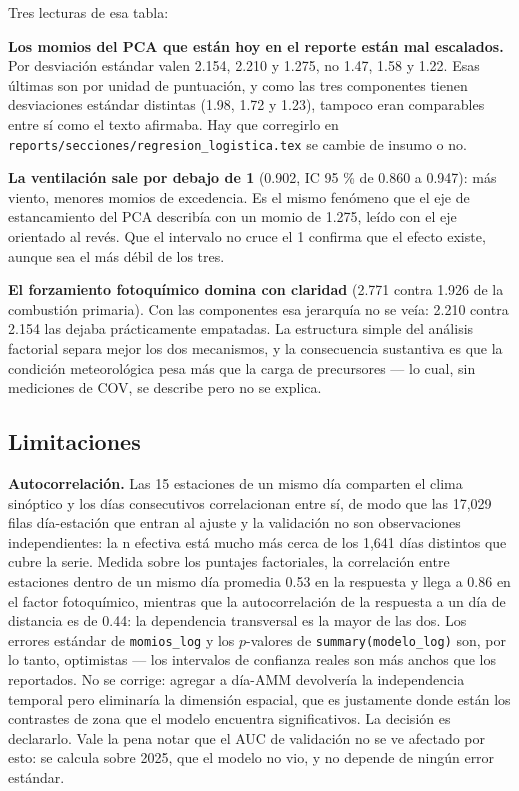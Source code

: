 \documentclass[
  spanish,
  letterpaper,
  DIV=11,
  numbers=noendperiod]{scrartcl}
\begin{document}
Tres lecturas de esa tabla:

\textbf{Los momios del PCA que están hoy en el reporte están mal
escalados.} Por desviación estándar valen 2.154, 2.210 y 1.275, no 1.47,
1.58 y 1.22. Esas últimas son por unidad de puntuación, y como las tres
componentes tienen desviaciones estándar distintas (1.98, 1.72 y 1.23),
tampoco eran comparables entre sí como el texto afirmaba. Hay que
corregirlo en \texttt{reports/secciones/regresion\_logistica.tex} se
cambie de insumo o no.

\textbf{La ventilación sale por debajo de 1} (0.902, IC 95 \% de 0.860 a
0.947): más viento, menores momios de excedencia. Es el mismo fenómeno
que el eje de estancamiento del PCA describía con un momio de 1.275,
leído con el eje orientado al revés. Que el intervalo no cruce el 1
confirma que el efecto existe, aunque sea el más débil de los tres.

\textbf{El forzamiento fotoquímico domina con claridad} (2.771 contra
1.926 de la combustión primaria). Con las componentes esa jerarquía no
se veía: 2.210 contra 2.154 las dejaba prácticamente empatadas. La
estructura simple del análisis factorial separa mejor los dos
mecanismos, y la consecuencia sustantiva es que la condición
meteorológica pesa más que la carga de precursores --- lo cual, sin
mediciones de COV, se describe pero no se explica.

\subsection{Limitaciones}\label{limitaciones}

\textbf{Autocorrelación.} Las 15 estaciones de un mismo día comparten el
clima sinóptico y los días consecutivos correlacionan entre sí, de modo
que las 17,029 filas día-estación que entran al ajuste y la validación
no son observaciones independientes: la n efectiva está mucho más cerca
de los 1,641 días distintos que cubre la serie. Medida sobre los
puntajes factoriales, la correlación entre estaciones dentro de un mismo
día promedia 0.53 en la respuesta y llega a 0.86 en el factor
fotoquímico, mientras que la autocorrelación de la respuesta a un día de
distancia es de 0.44: la dependencia transversal es la mayor de las dos.
Los errores estándar de \texttt{momios\_log} y los \(p\)-valores de
\texttt{summary(modelo\_log)} son, por lo tanto, optimistas --- los
intervalos de confianza reales son más anchos que los reportados. No se
corrige: agregar a día-AMM devolvería la independencia temporal pero
eliminaría la dimensión espacial, que es justamente donde están los
contrastes de zona que el modelo encuentra significativos. La decisión
es declararlo. Vale la pena notar que el AUC de validación no se ve
afectado por esto: se calcula sobre 2025, que el modelo no vio, y no
depende de ningún error estándar.
\end{document}
